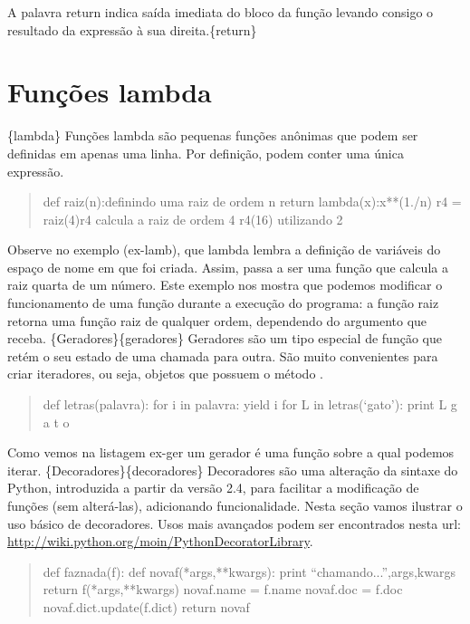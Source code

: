\documentclass[a4paper,10pt,portuguese]{sphinxmanual}
\begin{document}
A palavra return indica saída imediata do bloco da função levando
consigo o resultado da expressão à sua direita.\{return\}


\section{Funções lambda}
\label{Cap2:funcoes-lambda}
\{lambda\} Funções lambda são pequenas funções anônimas que podem ser
definidas em apenas uma linha. Por definição, podem conter uma
única expressão.
\begin{quote}

def raiz(n):definindo uma raiz de ordem n return
lambda(x):x**(1./n) r4 = raiz(4)r4 calcula a raiz de ordem 4
r4(16) utilizando 2
\end{quote}

Observe no exemplo (ex-lamb), que lambda lembra a definição de
variáveis do espaço de nome em que foi criada. Assim,  passa
a ser uma função que calcula a raiz quarta de um número. Este
exemplo nos mostra que podemos modificar o funcionamento de uma
função durante a execução do programa: a função raiz retorna uma
função raiz de qualquer ordem, dependendo do argumento que receba.
\{Geradores\}\{geradores\} Geradores são um tipo especial de função que
retém o seu estado de uma chamada para outra. São muito
convenientes para criar iteradores, ou seja, objetos que possuem o
método .
\begin{quote}

def letras(palavra): for i in palavra: yield i for L in
letras(`gato'): print L g a t o
\end{quote}

Como vemos na listagem ex-ger um gerador é uma função sobre a qual
podemos iterar. \{Decoradores\}\{decoradores\} Decoradores são uma
alteração da sintaxe do Python, introduzida a partir da versão 2.4,
para facilitar a modificação de funções (sem alterá-las),
adicionando funcionalidade. Nesta seção vamos ilustrar o uso básico
de decoradores. Usos mais avançados podem ser encontrados nesta
url: \href{http://wiki.python.org/moin/PythonDecoratorLibrary}{http://wiki.python.org/moin/PythonDecoratorLibrary}.
\begin{quote}

def faznada(f): def novaf(*args,**kwargs): print
``chamando...'',args,kwargs return f(*args,**kwargs) novaf.name =
f.name novaf.doc = f.doc novaf.dict.update(f.dict) return novaf
\end{quote}
\end{document}
